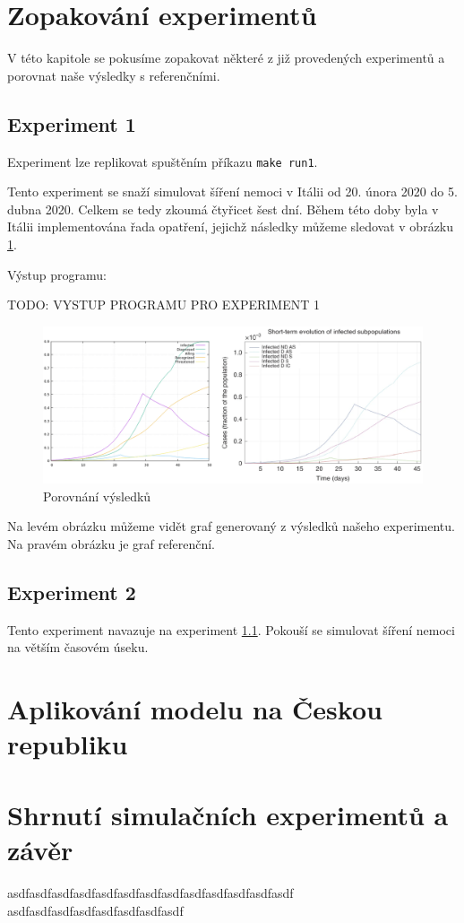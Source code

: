 \documentclass[a4paper,11pt]{article}
\begin{document}
	\section{Zopakování experimentů}
		V této kapitole se pokusíme zopakovat některé z již provedených experimentů a porovnat naše výsledky s referenčními.
	
		\subsection{Experiment 1}
		\label{e1}
			Experiment lze replikovat spuštěním příkazu \texttt{make run1}.
		
			Tento experiment se snaží simulovat šíření nemoci v Itálii od 20. února 2020 do 5. dubna 2020. Celkem se tedy zkoumá čtyřicet šest dní. Během této doby byla v Itálii implementována řada opatření, jejichž následky můžeme sledovat v obrázku \ref{fig2}.
			
			Výstup programu:
			
			TODO: VYSTUP PROGRAMU PRO EXPERIMENT 1

			
			\begin{figure}[H]
				\caption{Porovnání výsledků}
				\label{fig2}
				\centering
				\includegraphics[scale=0.6]{comparison.png}
			\end{figure}
			
			Na levém obrázku můžeme vidět graf generovaný z výsledků našeho experimentu. Na pravém obrázku je graf referenční. 
			
		\subsection{Experiment 2}
			Tento experiment navazuje na experiment \ref{e1}. Pokouší se simulovat šíření nemoci na větším časovém úseku. 
		
	\section{Aplikování modelu na Českou republiku}
	
	\section{Shrnutí simulačních experimentů a závěr}
		asdfasdfasdfasdfasdfasdfasdfasdfasdfasdfasdfasdfasdf
		asdfasdfasdfasdfasdfasdfasdfasdf

	\newpage
	
	\renewcommand{\refname}{Literatura}
	
\end{document}
